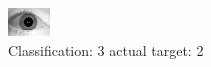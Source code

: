 \begin{figure}[h!]
\begin{center}
\includegraphics[width=0.60\columnwidth]{figures/ID1626_class_3_target_2.png}
\end{center}
\caption{ Classification: 3 actual target: 2}
\label{fig:ID1626_class_3_target_2}
\end{figure}
